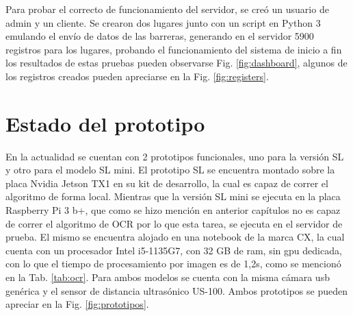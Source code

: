Para probar el correcto de funcionamiento del servidor, se creó un usuario de admin y un cliente. Se crearon dos lugares junto con un script en Python 3 emulando el envío de datos de las barreras, generando en el servidor 5900 registros para los lugares, probando el funcionamiento del sistema de inicio a fin los resultados de estas pruebas pueden observarse Fig. \ref{fig:dashboard}, algunos de los registros creados pueden apreciarse en la Fig. \ref{fig:registers}.

\section{Estado del prototipo}

En la actualidad se cuentan con 2 prototipos funcionales, uno para la versión SL y otro para el modelo SL mini.
El prototipo SL se encuentra montado sobre la placa Nvidia Jetson TX1 en su kit de desarrollo, la cual es capaz de correr el algoritmo de forma local.
Mientras que la versión SL mini se ejecuta en la placa Raspberry Pi 3 b+, que como se hizo mención en anterior capítulos no es capaz de correr el algoritmo de OCR por lo que esta tarea, se ejecuta en el servidor de prueba. El mismo se encuentra alojado en una notebook de la marca CX, la cual cuenta con un procesador Intel i5-1135G7, con 32 GB de ram, sin gpu dedicada, con lo que el tiempo de procesamiento por imagen es de 1,2s, como se mencionó en la Tab. \ref{tab:ocr}.
Para ambos modelos se cuenta con la misma cámara usb genérica y el sensor de distancia ultrasónico US-100.
Ambos prototipos se pueden apreciar en la Fig. \ref{fig:prototipos}.
